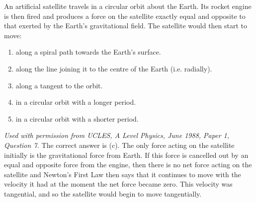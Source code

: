 \begin{problem}[A1988PIQ7l] 
{An artificial satellite travels in a circular orbit about the Earth. Its rocket engine is then fired and produces a force on the satellite exactly equal and opposite to that exerted by the Earth's gravitational field. The satellite would then start to move:
\begin{enumerate}
	\item along a spiral path towards the Earth's surface.
	\item along the line joining it to the centre of the Earth (i.e. radially).
	\item along a tangent to the orbit.
	\item in a circular orbit with a longer period.
	\item in a circular orbit with a shorter period.
\end{enumerate}}
{\textit{Used with permission from UCLES, A Level Physics, June 1988, Paper 1, Question 7.}}
{The correct answer is (c). The only force acting on the satellite initially is the gravitational force from Earth. If this force is cancelled out by an equal and opposite force from the engine, then there is no net force acting on the satellite and Newton's First Law then says that it continues to move with the velocity it had at the moment the net force became zero. This velocity was tangential, and so the satellite would begin to move tangentially.}
\end{problem}